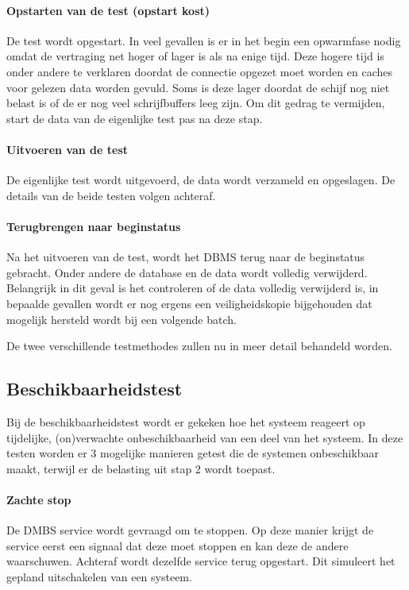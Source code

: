 \paragraph{Opstarten van de test (opstart kost)} De test wordt opgestart. In veel gevallen is er in het begin een opwarmfase nodig omdat de vertraging net hoger of lager is als na enige tijd. Deze hogere tijd is onder andere te verklaren doordat de connectie opgezet moet worden en caches voor gelezen data worden gevuld. Soms is deze lager doordat de schijf nog niet belast is of de er nog veel schrijfbuffers leeg zijn. Om dit gedrag te vermijden, start de data van de eigenlijke test pas na deze stap. 

\paragraph{Uitvoeren van de test} De eigenlijke test wordt uitgevoerd, de data wordt verzameld en opgeslagen. De details van de beide testen volgen achteraf. 

\paragraph{Terugbrengen naar beginstatus} Na het uitvoeren van de test, wordt het DBMS terug naar de beginstatus gebracht. Onder andere de database en de data wordt volledig verwijderd. Belangrijk in dit geval is het controleren of de data volledig verwijderd is, in bepaalde gevallen wordt er nog ergens een veiligheidskopie bijgehouden dat mogelijk hersteld wordt bij een volgende batch. 

De twee verschillende testmethodes zullen nu in meer detail behandeld worden. 
\subsection{Beschikbaarheidstest}
Bij de beschikbaarheidstest wordt er gekeken hoe het systeem reageert op tijdelijke, (on)verwachte onbeschikbaarheid van een deel van het systeem. In deze testen worden er 3 mogelijke manieren getest die de systemen onbeschikbaar maakt, terwijl er de belasting uit stap 2 wordt toepast. 

\paragraph{Zachte stop} De DMBS service wordt gevraagd om te stoppen. Op deze manier krijgt de service eerst een signaal dat deze moet stoppen en kan deze de andere waarschuwen. Achteraf wordt dezelfde service terug opgestart. Dit simuleert het gepland uitschakelen van een systeem. 

